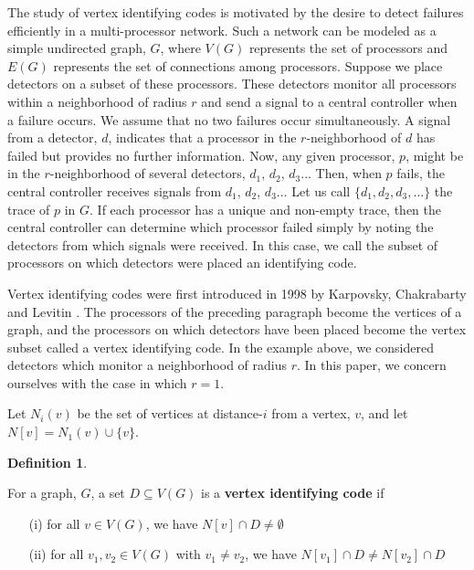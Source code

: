 \documentclass[12pt]{report}
\numberwithin{equation}{chapter}
\theoremstyle{definition}
\newtheorem{definition}[theorem]{Definition}
\theoremstyle{remark}
\begin{document}
The study of vertex identifying codes is motivated by the desire to detect failures efficiently in a multi-processor network.  Such a network can be modeled as a simple undirected graph, $G$, where $V(G)$ represents the set of processors and $E(G)$ represents the set of connections among processors.  Suppose we place detectors on a subset of these processors.  These detectors monitor all processors within a neighborhood of radius $r$ and send a signal to a central controller when a failure occurs.  We assume that no two failures occur simultaneously.  A signal from a detector, $d$, indicates that a processor in the $r$-neighborhood of $d$ has failed but provides no further information.  Now, any given processor, $p$, might be in the $r$-neighborhood of several detectors, $d_1$, $d_2$, $d_3$...  Then, when $p$ fails, the central controller receives signals from $d_1$, $d_2$, $d_3$...  Let us call $\{d_1, d_2, d_3, ... \}$ the trace of $p$ in $G$.  If each processor has a unique and non-empty trace, then the central controller can determine which processor failed simply by noting the detectors from which signals were received.  In this case, we call the subset of processors on which detectors were placed an identifying code.

Vertex identifying codes were first introduced in 1998 by Karpovsky, Chakrabarty and Levitin \cite{karpovsky}.  The processors of the preceding paragraph become the vertices of a graph, and the processors on which detectors have been placed become the vertex subset called a vertex identifying code.  In the example above, we considered detectors which monitor a neighborhood of radius $r$.  In this paper, we concern ourselves with the case in which $r=1$.  

Let $N_i(v)$ be the set of vertices at distance-$i$ from a vertex, $v$, and let $N[v] = N_1(v) \cup \{v\}$.

\bigskip

\begin{definition}
\label{VIC def}

For a graph, $G$, a set $D \subseteq V(G)$ is a {\bf vertex identifying code} if

\begin{itemize}

\item[(i)] for all $v \in V(G)$, we have $N[v] \cap D \not = \emptyset$

\item[(ii)] for all $v_1,v_2 \in V(G)$ with $v_1 \not = v_2$, we have $N[v_1] \cap D \not = N[v_2] \cap D$

\end{itemize}

\end{definition}
\end{document}
